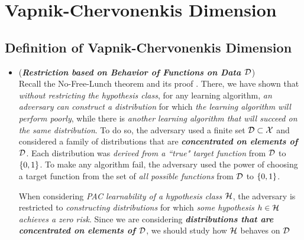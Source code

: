 \documentclass[11pt]{article}
\begin{document}
\section{Vapnik-Chervonenkis Dimension}
\subsection{Definition of Vapnik-Chervonenkis Dimension}
\begin{itemize}
\item \begin{remark} (\emph{\textbf{Restriction based on Behavior of Functions on Data ${\mathcal D}$}})\\
Recall the No-Free-Lunch theorem and its proof \citep{shalev2014understanding}. There, we have shown that \emph{without restricting the hypothesis class}, for any learning algorithm, \emph{an adversary can construct a distribution} for which \emph{the learning algorithm will perform poorly}, while there is \emph{another learning algorithm that will succeed on the same distribution}. To do so, the adversary used a finite set ${\mathcal D} \subset {\mathcal X}$ and considered a family of distributions that are
\emph{\textbf{concentrated on elements of ${\mathcal D}$}}. Each distribution was \emph{derived from a ``true" target function} from ${\mathcal D}$ to $\left\{0,1\right\}$. To make any algorithm fail, the adversary used the power of choosing a target function from the set of \emph{all possible functions} from ${\mathcal D}$ to $\left\{0,1\right\}$.

When considering \emph{PAC learnability of a hypothesis class ${\mathcal H}$}, the adversary is restricted to \emph{constructing distributions} for which \emph{some hypothesis $h \in {\mathcal H}$ achieves a zero risk}. Since we are considering \emph{\textbf{distributions that are concentrated on elements of ${\mathcal D}$}}, we should study how ${\mathcal H}$ behaves on ${\mathcal D}$
\end{remark}


\end{itemize}
\end{document}
